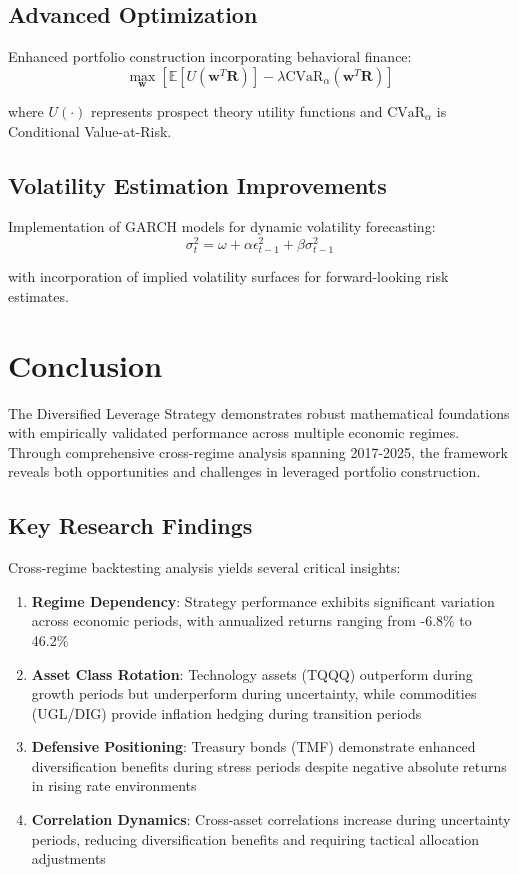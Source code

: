 \documentclass[onecolumn,ieee]{arithmaxresearch}
\begin{document}
\subsection{Advanced Optimization}

Enhanced portfolio construction incorporating behavioral finance:
\begin{equation}
\max_{\mathbf{w}} \left[ \mathbb{E}[U(\mathbf{w}^T \mathbf{R})] - \lambda \text{CVaR}_\alpha(\mathbf{w}^T \mathbf{R}) \right]
\end{equation}

where $U(\cdot)$ represents prospect theory utility functions and $\text{CVaR}_\alpha$ is Conditional Value-at-Risk.

\subsection{Volatility Estimation Improvements}

Implementation of GARCH models for dynamic volatility forecasting:
\begin{equation}
\sigma_t^2 = \omega + \alpha \epsilon_{t-1}^2 + \beta \sigma_{t-1}^2
\end{equation}

with incorporation of implied volatility surfaces for forward-looking risk estimates.

\section{Conclusion}

The Diversified Leverage Strategy demonstrates robust mathematical foundations with empirically validated performance across multiple economic regimes. Through comprehensive cross-regime analysis spanning 2017-2025, the framework reveals both opportunities and challenges in leveraged portfolio construction.

\subsection{Key Research Findings}

Cross-regime backtesting analysis yields several critical insights:

\begin{enumerate}
    \item \textbf{Regime Dependency}: Strategy performance exhibits significant variation across economic periods, with annualized returns ranging from -6.8\% to 46.2\%
    \item \textbf{Asset Class Rotation}: Technology assets (TQQQ) outperform during growth periods but underperform during uncertainty, while commodities (UGL/DIG) provide inflation hedging during transition periods
    \item \textbf{Defensive Positioning}: Treasury bonds (TMF) demonstrate enhanced diversification benefits during stress periods despite negative absolute returns in rising rate environments
    \item \textbf{Correlation Dynamics}: Cross-asset correlations increase during uncertainty periods, reducing diversification benefits and requiring tactical allocation adjustments
\end{enumerate}
\end{document}
